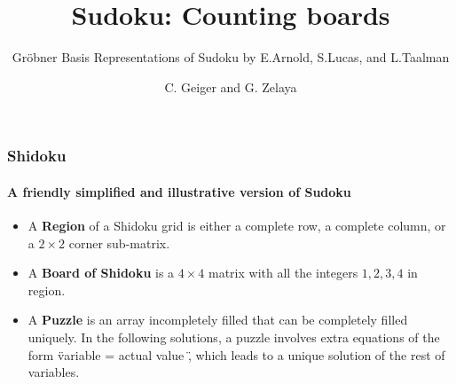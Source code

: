 \documentclass{beamer}
\title{Sudoku: Counting boards}
\subtitle{Gr\" obner Basis Representations of Sudoku by E.Arnold, S.Lucas, and L.Taalman}
\author{C. Geiger and  G. Zelaya}
\institute{University of Washington, Seattle}
\begin{document}
\maketitle

\begin{frame}
\frametitle{Shidoku}
\framesubtitle{A friendly simplified and illustrative version of Sudoku}
\begin{itemize}
\item A \textbf{Region} of a Shidoku grid is either a complete row, a complete column, or a $2\times 2$ corner sub-matrix.

\item A \textbf{Board of Shidoku} is a $4 \times 4$ matrix with all the integers $1,2,3,4$ in region. \\

\item A \textbf{Puzzle} is an array incompletely filled that can be completely filled uniquely. In the following solutions, a puzzle involves extra equations of the form \" variable =  actual value \", which leads to a unique solution of the rest of variables. 
\end{itemize}


\end{frame}
\end{document}
